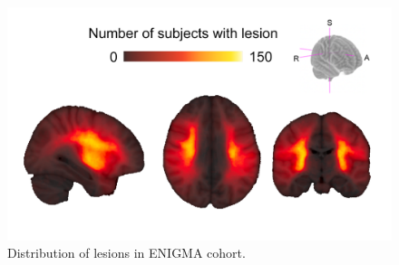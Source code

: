 \documentclass[10pt]{article}
\newcommand{\beginsupplement}{%
\setcounter{table}{0}
\renewcommand{\thetable}{S\arabic{table}}%
\setcounter{figure}{0}
\renewcommand{\thefigure}{S\arabic{figure}}%
}
\begin{document}
\beginsupplement
\begin{figure}[ht]
\centering
\includegraphics[width=0.8\linewidth]{figures/distribution_lesions.png}
\caption{Distribution of lesions in ENIGMA cohort.}
\label{lesiondist}
\end{figure}
\end{document}
